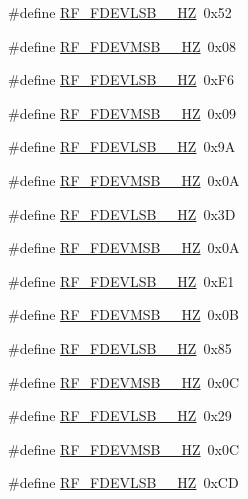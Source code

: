 \begin{DoxyCompactItemize}
\item 
\#define \hyperlink{sx1276Regs-Fsk_8h_aa2e0e0c7fe24f55eb301861dcfc3a424}{R\+F\+\_\+\+F\+D\+E\+V\+L\+S\+B\+\_\+\_\+\+HZ}~0x52
\item 
\#define \hyperlink{sx1276Regs-Fsk_8h_a110048d122625ad47fb9d89e148dc5d2}{R\+F\+\_\+\+F\+D\+E\+V\+M\+S\+B\+\_\+\_\+\+HZ}~0x08
\item 
\#define \hyperlink{sx1276Regs-Fsk_8h_a080114dabe30fe534828104407a2722c}{R\+F\+\_\+\+F\+D\+E\+V\+L\+S\+B\+\_\+\_\+\+HZ}~0x\+F6
\item 
\#define \hyperlink{sx1276Regs-Fsk_8h_a7bb4105e24da2db3a56553eb96b85fee}{R\+F\+\_\+\+F\+D\+E\+V\+M\+S\+B\+\_\+\_\+\+HZ}~0x09
\item 
\#define \hyperlink{sx1276Regs-Fsk_8h_a71f7698b87a725be1779b76b935e6a6f}{R\+F\+\_\+\+F\+D\+E\+V\+L\+S\+B\+\_\+\_\+\+HZ}~0x9A
\item 
\#define \hyperlink{sx1276Regs-Fsk_8h_a968b4f3ec96d855980589e665504ed37}{R\+F\+\_\+\+F\+D\+E\+V\+M\+S\+B\+\_\+\_\+\+HZ}~0x0A
\item 
\#define \hyperlink{sx1276Regs-Fsk_8h_a39866c54593a2235f4420210b5b80603}{R\+F\+\_\+\+F\+D\+E\+V\+L\+S\+B\+\_\+\_\+\+HZ}~0x3D
\item 
\#define \hyperlink{sx1276Regs-Fsk_8h_a6b284d8f5090feebc648fdd533537e3c}{R\+F\+\_\+\+F\+D\+E\+V\+M\+S\+B\+\_\+\_\+\+HZ}~0x0A
\item 
\#define \hyperlink{sx1276Regs-Fsk_8h_a22d756238beb3bcd0a2a529f14a39ad5}{R\+F\+\_\+\+F\+D\+E\+V\+L\+S\+B\+\_\+\_\+\+HZ}~0x\+E1
\item 
\#define \hyperlink{sx1276Regs-Fsk_8h_a46b03842ce006837e2c6c45b445491d8}{R\+F\+\_\+\+F\+D\+E\+V\+M\+S\+B\+\_\+\_\+\+HZ}~0x0B
\item 
\#define \hyperlink{sx1276Regs-Fsk_8h_a1be73f0e78b52c082eeeaffe963f599a}{R\+F\+\_\+\+F\+D\+E\+V\+L\+S\+B\+\_\+\_\+\+HZ}~0x85
\item 
\#define \hyperlink{sx1276Regs-Fsk_8h_a630069f35932526b025935cdd3450410}{R\+F\+\_\+\+F\+D\+E\+V\+M\+S\+B\+\_\+\_\+\+HZ}~0x0C
\item 
\#define \hyperlink{sx1276Regs-Fsk_8h_a0053271b65e629e9cdaa5c3f345158d3}{R\+F\+\_\+\+F\+D\+E\+V\+L\+S\+B\+\_\+\_\+\+HZ}~0x29
\item 
\#define \hyperlink{sx1276Regs-Fsk_8h_ab1dad7f0e5a571acc531e431108a9fc9}{R\+F\+\_\+\+F\+D\+E\+V\+M\+S\+B\+\_\+\_\+\+HZ}~0x0C
\item 
\#define \hyperlink{sx1276Regs-Fsk_8h_a1f18878e3fdfb4aa5770666f80fe0cac}{R\+F\+\_\+\+F\+D\+E\+V\+L\+S\+B\+\_\+\_\+\+HZ}~0x\+CD

\end{DoxyCompactItemize}
